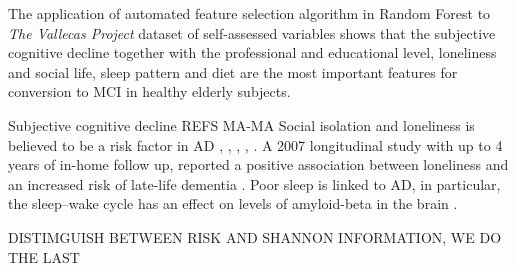 \documentclass[preprint,12pt]{elsarticle}
\begin{document}
The application of automated feature selection algorithm in Random Forest to \emph{The Vallecas Project} dataset of self-assessed variables shows that the subjective cognitive decline together with the professional and educational level, loneliness and social life, sleep pattern and diet are the most important features for conversion to MCI in healthy elderly subjects.

Subjective cognitive decline REFS MA-MA %
Social isolation and loneliness is believed to be a risk factor in AD \cite{holmen1992loneliness}, \cite{fratiglioni2000influence}, \cite{shankar2013social}, \cite{holwerda2014feelings}, \cite{evans2018social}. A 2007 longitudinal study with up to 4 years of in-home follow up, reported a positive association between loneliness and an increased risk of late-life dementia \cite{wilson2007loneliness}. Poor sleep is linked to AD, in particular, the sleep–wake cycle has an effect on levels of amyloid-beta in the brain \cite{ju2014sleep}.


DISTIMGUISH BETWEEN RISK AND SHANNON INFORMATION, WE DO THE LAST











\end{document}
